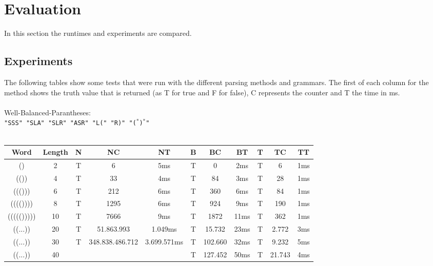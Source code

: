 \documentclass[a4paper, 11pt]{article}
\begin{document}

\pagebreak













\section{Evaluation}
\label{evaluation}

In this section the runtimes and experiments are compared.


\subsection{Experiments}
\label{experiments}

The following tables show some tests that were run with the different parsing methods and grammars. The first of each column for the method shows the truth value that is returned (as T for true and F for false), C represents the counter and T the time in ms.
\\
\\
Well-Balanced-Parantheses: \\
\texttt{"SSS" "SLA" "SLR" "ASR" "L(" "R)" "($^*$)$^*$"}
\ \\ \\
\begin{small}
\begin{tabular}{|c|c||c|c|c||c|c|c||c|c|c|}
\hline
Word & Length & N & NC & NT & B & BC & BT & T & TC & TT \\
\hline
\hline
() & 2 & T & 6 & 5ms & T & 0 & 2ms & T & 6 & 1ms \\
\hline
(()) & 4 & T & 33 & 4ms & T & 84 & 3ms & T & 28 & 1ms \\
\hline
((())) & 6 & T & 212 & 6ms & T & 360 & 6ms & T & 84 & 1ms \\
\hline
(((()))) & 8 & T & 1295 & 6ms & T & 924 & 9ms & T & 190 & 1ms \\
\hline
((((())))) & 10 & T & 7666 & 9ms & T & 1872 & 11ms & T & 362 & 1ms \\
\hline
((...)) & 20 & T & 51.863.993 & 1.049ms & T & 15.732 & 23ms & T & 2.772 & 3ms \\
\hline
((...)) & 30 & T & 348.838.486.712 & 3.699.571ms & T & 102.660 & 32ms & T & 9.232 & 5ms \\
\hline
((...)) & 40 & & & & T & 127.452 & 50ms & T & 21.743 & 4ms \\
\hline
\end{tabular}
\end{small}
\end{document}
